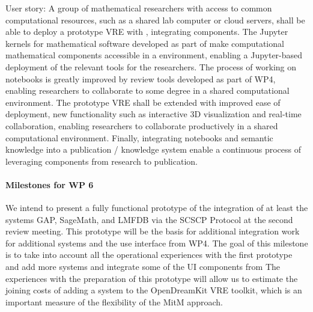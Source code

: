 \begin{milestones}
  {
  User story: A group of mathematical researchers with access to
  common computational resources, such as a shared lab computer or
  cloud servers, shall be able to deploy a prototype VRE with
  \JupyterHub, integrating \ODK components.
  The Jupyter kernels for mathematical software developed as part of \ODK
  make computational mathematical components accessible in a \Jupyter
  environment, enabling a Jupyter-based deployment of the relevant
  tools for the researchers.
  The process of working on notebooks is greatly improved by review tools
  developed as part of WP4,
  enabling researchers to collaborate to some degree
  in a shared computational environment.
  }
  {
  The prototype VRE shall be extended with improved ease of deployment, new
  functionality such as interactive 3D visualization and real-time
  collaboration, enabling researchers to collaborate productively in a shared
  computational environment. Finally, integrating notebooks and semantic
  knowledge into a publication / knowledge system enable a continuous process
  of leveraging \ODK components from research to publication.
  }
\end{milestones}

\paragraph{Milestones for WP 6}

\begin{milestones}
  {We intend to present a fully functional prototype of the integration of at least the
    systems GAP, SageMath, and LMFDB via the SCSCP Protocol at the second review 
    meeting. This prototype will be the basis for additional integration work for 
    additional systems and the use interface from WP4.}
  {The goal of this milestone is to take into account all the operational 
    experiences with the first prototype and add more systems and integrate some
    of the UI components from The experiences with the preparation of 
    this prototype will allow us to estimate the joining costs of adding a system 
    to the OpenDreamKit VRE toolkit, which is an important measure of the 
    flexibility of the MitM approach.}
\end{milestones}


